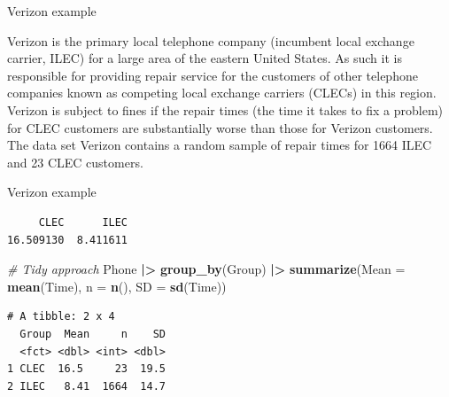 \documentclass[
  ignorenonframetext,
]{beamer}
\newenvironment{Shaded}{\begin{snugshade}}{\end{snugshade}}
\newcommand{\AttributeTok}[1]{\textcolor[rgb]{0.13,0.29,0.53}{#1}}
\newcommand{\CommentTok}[1]{\textcolor[rgb]{0.56,0.35,0.01}{\textit{#1}}}
\newcommand{\FunctionTok}[1]{\textcolor[rgb]{0.13,0.29,0.53}{\textbf{#1}}}
\newcommand{\NormalTok}[1]{#1}
\newcommand{\OtherTok}[1]{\textcolor[rgb]{0.56,0.35,0.01}{#1}}
\newcommand{\SpecialCharTok}[1]{\textcolor[rgb]{0.81,0.36,0.00}{\textbf{#1}}}
\begin{document}
\begin{frame}{Verizon example}
\protect\hypertarget{verizon-example}{}
\begin{tcolorbox}
Verizon is the primary local telephone company (incumbent local exchange carrier, ILEC) for a large area of the eastern United States. As such it is responsible for providing repair service for the customers of other telephone companies known as competing local exchange carriers (CLECs) in this region. Verizon is subject to fines if the repair times (the time it takes to fix a problem) for CLEC customers are substantially worse than those for Verizon customers. The data set Verizon contains a random sample of repair times for 1664 ILEC and 23 CLEC customers.
\end{tcolorbox}
\end{frame}

\begin{frame}[fragile]{Verizon example}
\protect\hypertarget{verizon-example-1}{}
\normalsize

\begin{Shaded}
\end{Shaded}

\begin{verbatim}
     CLEC      ILEC 
16.509130  8.411611 
\end{verbatim}

\begin{Shaded}
\begin{Highlighting}[]
\CommentTok{\# Tidy approach}
\NormalTok{Phone }\SpecialCharTok{|\textgreater{}} 
  \FunctionTok{group\_by}\NormalTok{(Group) }\SpecialCharTok{|\textgreater{}} 
  \FunctionTok{summarize}\NormalTok{(}\AttributeTok{Mean =} \FunctionTok{mean}\NormalTok{(Time), }\AttributeTok{n =} \FunctionTok{n}\NormalTok{(), }\AttributeTok{SD =} \FunctionTok{sd}\NormalTok{(Time))}
\end{Highlighting}
\end{Shaded}

\begin{verbatim}
# A tibble: 2 x 4
  Group  Mean     n    SD
  <fct> <dbl> <int> <dbl>
1 CLEC  16.5     23  19.5
2 ILEC   8.41  1664  14.7
\end{verbatim}

\normalsize
\end{frame}
\end{document}
